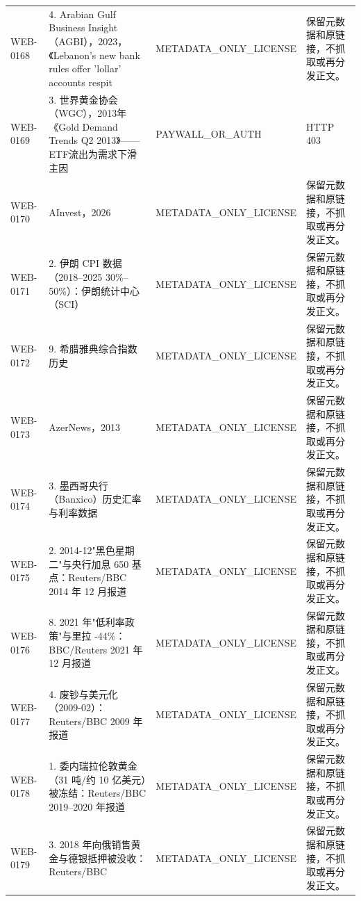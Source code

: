\documentclass[UTF8,openany,oneside,11pt]{ctexbook}
\begin{document}
\begin{longtable}{L{1.5cm}L{5.5cm}L{3cm}L{5cm}}
WEB-\allowbreak{}0168 & 4. Arabian Gulf Business Insight（AGBI），2023，《Lebanon's new bank rules offer 'lollar' accounts respit & METADATA\_\allowbreak{}ONLY\_\allowbreak{}LICENSE & 保留元数据和原链接，不抓取或再分发正文。 \\
WEB-\allowbreak{}0169 & 3. 世界黄金协会（WGC），2013年《Gold Demand Trends Q2 2013》——ETF流出为需求下滑主因 & PAYWALL\_\allowbreak{}OR\_\allowbreak{}AUTH & HTTP 403 \\
WEB-\allowbreak{}0170 & AInvest，2026 & METADATA\_\allowbreak{}ONLY\_\allowbreak{}LICENSE & 保留元数据和原链接，不抓取或再分发正文。 \\
WEB-\allowbreak{}0171 & 2. 伊朗 CPI 数据（2018–2025 30\%–50\%）：伊朗统计中心（SCI） & METADATA\_\allowbreak{}ONLY\_\allowbreak{}LICENSE & 保留元数据和原链接，不抓取或再分发正文。 \\
WEB-\allowbreak{}0172 & 9. 希腊雅典综合指数历史 & METADATA\_\allowbreak{}ONLY\_\allowbreak{}LICENSE & 保留元数据和原链接，不抓取或再分发正文。 \\
WEB-\allowbreak{}0173 & AzerNews，2013 & METADATA\_\allowbreak{}ONLY\_\allowbreak{}LICENSE & 保留元数据和原链接，不抓取或再分发正文。 \\
WEB-\allowbreak{}0174 & 3. 墨西哥央行（Banxico）历史汇率与利率数据 & METADATA\_\allowbreak{}ONLY\_\allowbreak{}LICENSE & 保留元数据和原链接，不抓取或再分发正文。 \\
WEB-\allowbreak{}0175 & 2. 2014-\allowbreak{}12"黑色星期二"与央行加息 650 基点：Reuters/\allowbreak{}BBC 2014 年 12 月报道 & METADATA\_\allowbreak{}ONLY\_\allowbreak{}LICENSE & 保留元数据和原链接，不抓取或再分发正文。 \\
WEB-\allowbreak{}0176 & 8. 2021 年"低利率政策"与里拉 -\allowbreak{}44\%：BBC/\allowbreak{}Reuters 2021 年 12 月报道 & METADATA\_\allowbreak{}ONLY\_\allowbreak{}LICENSE & 保留元数据和原链接，不抓取或再分发正文。 \\
WEB-\allowbreak{}0177 & 4. 废钞与美元化（2009-\allowbreak{}02）：Reuters/\allowbreak{}BBC 2009 年报道 & METADATA\_\allowbreak{}ONLY\_\allowbreak{}LICENSE & 保留元数据和原链接，不抓取或再分发正文。 \\
WEB-\allowbreak{}0178 & 1. 委内瑞拉伦敦黄金（31 吨/\allowbreak{}约 10 亿美元）被冻结：Reuters/\allowbreak{}BBC 2019–2020 年报道 & METADATA\_\allowbreak{}ONLY\_\allowbreak{}LICENSE & 保留元数据和原链接，不抓取或再分发正文。 \\
WEB-\allowbreak{}0179 & 3. 2018 年向俄销售黄金与德银抵押被没收：Reuters/\allowbreak{}BBC & METADATA\_\allowbreak{}ONLY\_\allowbreak{}LICENSE & 保留元数据和原链接，不抓取或再分发正文。 \\

\end{longtable}
\end{document}
